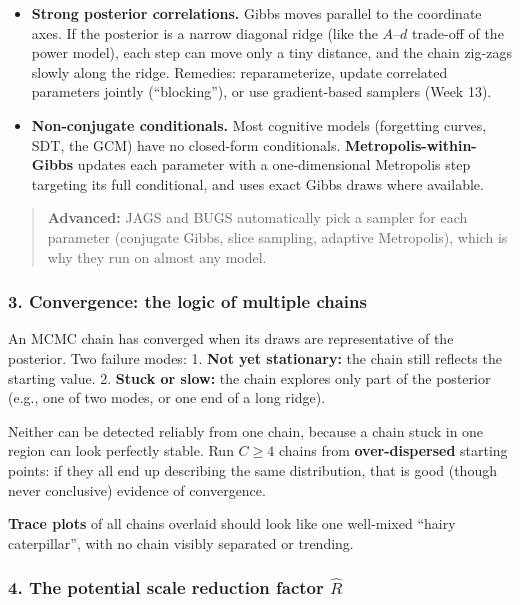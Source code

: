 \begin{itemize}
\tightlist
\item
  \textbf{Strong posterior correlations.} Gibbs moves parallel to the
  coordinate axes. If the posterior is a narrow diagonal ridge (like the
  \(A\)--\(d\) trade-off of the power model), each step can move only a
  tiny distance, and the chain zig-zags slowly along the ridge.
  Remedies: reparameterize, update correlated parameters jointly
  (``blocking''), or use gradient-based samplers (Week 13).
\item
  \textbf{Non-conjugate conditionals.} Most cognitive models (forgetting
  curves, SDT, the GCM) have no closed-form conditionals.
  \textbf{Metropolis-within-Gibbs} updates each parameter with a
  one-dimensional Metropolis step targeting its full conditional, and
  uses exact Gibbs draws where available.
\end{itemize}

\begin{quote}
\textbf{Advanced:} JAGS and BUGS automatically pick a sampler for each
parameter (conjugate Gibbs, slice sampling, adaptive Metropolis), which
is why they run on almost any model.
\end{quote}

\subsubsection{3. Convergence: the logic of multiple chains}

An MCMC chain has converged when its draws are representative of the
posterior. Two failure modes: 1. \textbf{Not yet stationary:} the chain
still reflects the starting value. 2. \textbf{Stuck or slow:} the chain
explores only part of the posterior (e.g., one of two modes, or one end
of a long ridge).

Neither can be detected reliably from one chain, because a chain stuck
in one region can look perfectly stable. Run \(C \ge 4\) chains from
\textbf{over-dispersed} starting points: if they all end up describing
the same distribution, that is good (though never conclusive) evidence
of convergence.

\textbf{Trace plots} of all chains overlaid should look like one
well-mixed ``hairy caterpillar'', with no chain visibly separated or
trending.

\subsubsection{\texorpdfstring{4. The potential scale reduction factor
\(\hat R\)}{4. The potential scale reduction factor \textbackslash hat R}}

